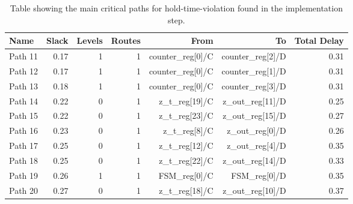 \begin{table}[H]
    \centering
    \small
    \captionsetup{skip=10pt} 
    \begin{tabular}{lrrrrrr}
        \hline
        Name    & Slack & Levels & Routes  & From                              & To                    & Total Delay \\
        \hline
        Path 11 & 0.17  & 1      & 1       & counter\_reg[0]/C                & counter\_reg[2]/D     & 0.31       \\
        Path 12 & 0.17  & 1      & 1       & counter\_reg[0]/C                & counter\_reg[1]/D     & 0.31       \\
        Path 13 & 0.18  & 1      & 1       & counter\_reg[0]/C                & counter\_reg[3]/D     & 0.31       \\
        Path 14 & 0.22  & 0      & 1       & z\_t\_reg[19]/C                  & z\_out\_reg[11]/D     & 0.25       \\
        Path 15 & 0.22  & 0      & 1       & z\_t\_reg[23]/C                  & z\_out\_reg[15]/D     & 0.27       \\
        Path 16 & 0.23  & 0      & 1       & z\_t\_reg[8]/C                   & z\_out\_reg[0]/D      & 0.26       \\
        Path 17 & 0.25  & 0      & 1       & z\_t\_reg[12]/C                  & z\_out\_reg[4]/D      & 0.35       \\
        Path 18 & 0.25  & 0      & 1       & z\_t\_reg[22]/C                  & z\_out\_reg[14]/D     & 0.33       \\
        Path 19 & 0.26  & 1      & 1       & FSM\_reg[0]/C                    & FSM\_reg[0]/D         & 0.35 \\
        Path 20 & 0.27  & 0      & 1       & z\_t\_reg[18]/C                  & z\_out\_reg[10]/D     & 0.37       \\
        \hline
    \end{tabular}
    \caption{Table showing the main critical paths for hold-time-violation found in the implementation step.}
    \label{tab:hold_implementation}
\end{table}

